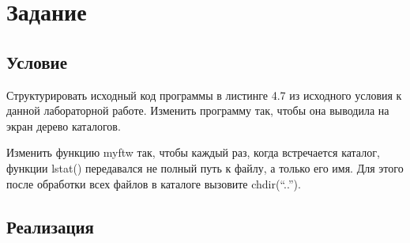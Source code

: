 \chapter{Задание}

\section{Условие}
Структурировать исходный код программы в листинге 4.7 из исходного условия к данной лабораторной работе. Изменить программу так, чтобы она выводила на экран дерево каталогов.

Изменить функцию myftw так, чтобы каждый раз, когда встречается каталог, функции lstat() передавался не полный путь к файлу, а только его имя. Для этого после обработки всех файлов в каталоге вызовите chdir(“..”).

\section{Реализация}

